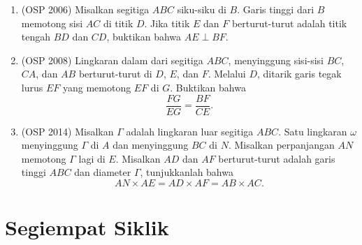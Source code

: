 \documentclass[12pt]{scrartcl}
\begin{document}
\begin{enumerate}[resume]

	\item (OSP 2006)
	Misalkan segitiga $ABC$ siku-siku di $B$. Garis tinggi dari $B$ memotong sisi $AC$ di titik $D$. Jika titik $E$ dan $F$ berturut-turut adalah titik tengah $BD$ dan $CD$, buktikan bahwa $AE \perp BF$.

	\item (OSP 2008)
	Lingkaran dalam dari segitiga $ABC$, menyinggung sisi-sisi $BC$, $CA$, dan $AB$ berturut-turut di $D$, $E$, dan $F$. Melalui $D$, ditarik garis tegak lurus $EF$ yang memotong $EF$ di $G$. Buktikan bahwa
	\[ \frac{FG}{EG}=\frac{BF}{CE}. \]

	\item (OSP 2014)
	Misalkan $\Gamma$ adalah lingkaran luar segitiga $ABC$. Satu lingkaran $\omega$ menyinggung $\Gamma$ di $A$ dan menyinggung $BC$ di $N$. Misalkan perpanjangan $AN$ memotong $\Gamma$ lagi di $E$. Misalkan $AD$ dan $AF$ berturut-turut adalah garis tinggi $ABC$ dan diameter $\Gamma$, tunjukkanlah bahwa
	\[ AN \times AE = AD \times AF = AB \times AC. \]

\end{enumerate}

\section{Segiempat Siklik}
\end{document}
